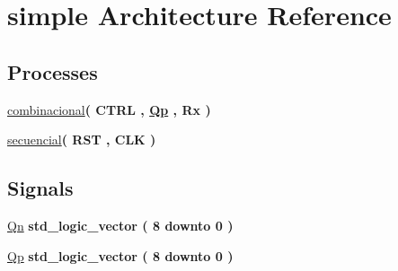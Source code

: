 \hypertarget{classregister__of__displacement_1_1simple}{}\section{simple Architecture Reference}
\label{classregister__of__displacement_1_1simple}
\subsection*{Processes}
 \begin{DoxyCompactItemize}
\item 
\hyperlink{classregister__of__displacement_1_1simple_a6a77de314fb002b2bd01c3801d4f7b02}{combinacional}{\bfseries  ( {\bfseries \textcolor{vhdlchar}{C\+T\+R\+L}\textcolor{vhdlchar}{ }} , {\bfseries {\bfseries \hyperlink{classregister__of__displacement_1_1simple_a5930cb4bd4c722ccf255f97959db7c6c}{Qp}} \textcolor{vhdlchar}{ }} , {\bfseries \textcolor{vhdlchar}{Rx}\textcolor{vhdlchar}{ }} )}
\item 
\hyperlink{classregister__of__displacement_1_1simple_aca20da2441863d4ca120eaf8891575c9}{secuencial}{\bfseries  ( {\bfseries \textcolor{vhdlchar}{R\+S\+T}\textcolor{vhdlchar}{ }} , {\bfseries \textcolor{vhdlchar}{C\+L\+K}\textcolor{vhdlchar}{ }} )}
\end{DoxyCompactItemize}
\subsection*{Signals}
 \begin{DoxyCompactItemize}
\item 
\hyperlink{classregister__of__displacement_1_1simple_abbd7ea6ffd0b7c1c791c633073814234}{Qn} {\bfseries \textcolor{comment}{std\+\_\+logic\+\_\+vector}\textcolor{vhdlchar}{ }\textcolor{vhdlchar}{(}\textcolor{vhdlchar}{ }\textcolor{vhdlchar}{ } \textcolor{vhdldigit}{8} \textcolor{vhdlchar}{ }\textcolor{keywordflow}{downto}\textcolor{vhdlchar}{ }\textcolor{vhdlchar}{ } \textcolor{vhdldigit}{0} \textcolor{vhdlchar}{ }\textcolor{vhdlchar}{)}\textcolor{vhdlchar}{ }} 
\item 
\hyperlink{classregister__of__displacement_1_1simple_a5930cb4bd4c722ccf255f97959db7c6c}{Qp} {\bfseries \textcolor{comment}{std\+\_\+logic\+\_\+vector}\textcolor{vhdlchar}{ }\textcolor{vhdlchar}{(}\textcolor{vhdlchar}{ }\textcolor{vhdlchar}{ } \textcolor{vhdldigit}{8} \textcolor{vhdlchar}{ }\textcolor{keywordflow}{downto}\textcolor{vhdlchar}{ }\textcolor{vhdlchar}{ } \textcolor{vhdldigit}{0} \textcolor{vhdlchar}{ }\textcolor{vhdlchar}{)}\textcolor{vhdlchar}{ }} 
\end{DoxyCompactItemize}


